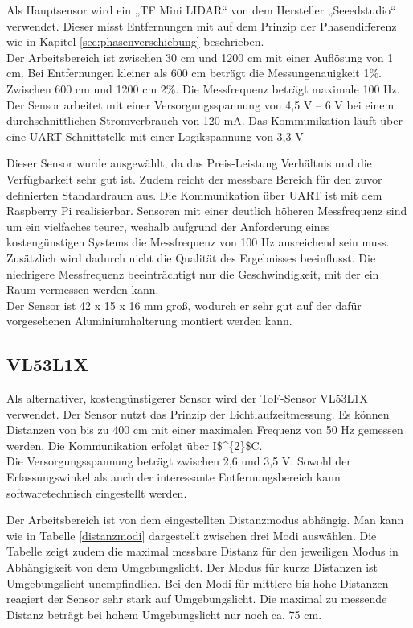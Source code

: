 Als Hauptsensor wird ein „TF Mini \ac{LIDAR}“ von dem Hersteller „Seeedstudio“ verwendet. Dieser misst Entfernungen mit auf dem Prinzip der Phasendifferenz wie in Kapitel \ref{sec:phasenverschiebung} beschrieben.\\
Der Arbeitsbereich ist zwischen 30 cm und 1200 cm mit einer Auflösung von 1 cm. Bei Entfernungen kleiner als 600 cm beträgt die Messungenauigkeit 1\%. Zwischen 600 cm und 1200 cm 2\%. Die Messfrequenz beträgt maximale 100 Hz.\\
Der Sensor arbeitet mit einer Versorgungsspannung von 4,5 V – 6 V bei einem durchschnittlichen Stromverbrauch von 120 mA. Das Kommunikation läuft über eine \ac{UART} Schnittstelle mit einer Logikspannung von 3,3 V

Dieser Sensor wurde ausgewählt, da das Preis-Leistung Verhältnis und die Verfügbarkeit sehr gut ist. Zudem reicht der messbare Bereich für den zuvor definierten Standardraum aus. Die Kommunikation über \ac{UART} ist mit dem Raspberry Pi realisierbar. Sensoren mit einer deutlich höheren Messfrequenz sind um ein vielfaches teurer, weshalb aufgrund der Anforderung eines kostengünstigen Systems die Messfrequenz von 100 Hz  ausreichend sein muss. Zusätzlich wird dadurch nicht die Qualität des Ergebnisses beeinflusst. Die niedrigere Messfrequenz beeinträchtigt nur die Geschwindigkeit, mit der ein Raum vermessen werden kann. \\
Der Sensor ist 42 x 15 x 16 mm groß, wodurch er sehr gut auf der dafür vorgesehenen Aluminiumhalterung montiert werden kann. \cite{TF MINI}


\subsection{VL53L1X} \label{sec:VL53L1X}

Als alternativer, kostengünstigerer Sensor wird der \ac{ToF}-Sensor VL53L1X verwendet. Der Sensor nutzt das Prinzip der Lichtlaufzeitmessung. Es können Distanzen von bis zu 400 cm mit einer maximalen Frequenz von 50 Hz gemessen werden. Die Kommunikation erfolgt über \ac{I$^{2}$C}. \\
Die Versorgungsspannung beträgt zwischen 2,6 und 3,5 V. Sowohl der Erfassungswinkel als auch der interessante Entfernungsbereich kann softwaretechnisch eingestellt werden. \cite{VL53L1X}

Der Arbeitsbereich ist von dem eingestellten Distanzmodus abhängig. Man kann wie in Tabelle \ref{distanzmodi} dargestellt zwischen drei Modi auswählen. Die Tabelle zeigt zudem die maximal messbare Distanz für den jeweiligen Modus in Abhängigkeit von dem Umgebungslicht. Der Modus für kurze Distanzen ist  Umgebungslicht unempfindlich. Bei den Modi für mittlere bis hohe Distanzen reagiert der Sensor sehr stark auf Umgebungslicht. Die maximal zu messende Distanz beträgt bei hohem Umgebungslicht nur noch ca. 75 cm. 

